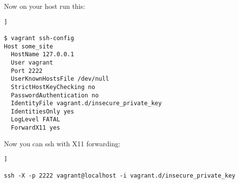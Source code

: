 Now on your host run this:

\begin{lstlisting}[breaklines=true, style=c]]

$ vagrant ssh-config
Host some_site
  HostName 127.0.0.1
  User vagrant
  Port 2222
  UserKnownHostsFile /dev/null
  StrictHostKeyChecking no
  PasswordAuthentication no
  IdentityFile vagrant.d/insecure_private_key
  IdentitiesOnly yes
  LogLevel FATAL
  ForwardX11 yes

\end{lstlisting}

Now you can ssh with X11 forwarding:

\begin{lstlisting}[breaklines=true, style=c]]

ssh -X -p 2222 vagrant@localhost -i vagrant.d/insecure_private_key

\end{lstlisting}


